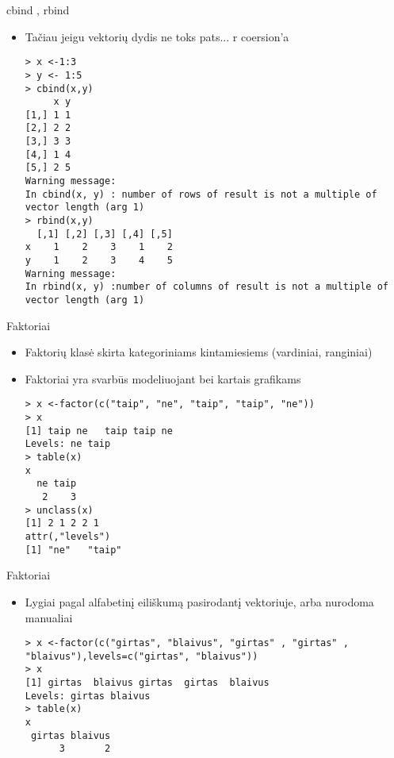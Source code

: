 \documentclass[11pt,xcolor=table]{beamer}
\begin{document}

\begin{frame}[fragile]{cbind , rbind}
\begin{itemize}
\item Tačiau jeigu vektorių dydis ne toks pats... r coersion'a 
\begin{lstlisting}
> x <-1:3
> y <- 1:5
> cbind(x,y)
     x y
[1,] 1 1
[2,] 2 2
[3,] 3 3
[4,] 1 4
[5,] 2 5
Warning message:
In cbind(x, y) : number of rows of result is not a multiple of vector length (arg 1)
> rbind(x,y)
  [,1] [,2] [,3] [,4] [,5]
x    1    2    3    1    2
y    1    2    3    4    5
Warning message:
In rbind(x, y) :number of columns of result is not a multiple of vector length (arg 1)
\end{lstlisting}
\end{itemize}
\end{frame}



\begin{frame}[fragile]{Faktoriai}
\begin{itemize}
\item Faktorių klasė skirta kategoriniams kintamiesiems (vardiniai, ranginiai)
\item Faktoriai yra svarbūs modeliuojant bei kartais grafikams

\begin{lstlisting}
> x <-factor(c("taip", "ne", "taip", "taip", "ne"))
> x
[1] taip ne   taip taip ne  
Levels: ne taip
> table(x)
x
  ne taip 
   2    3 
> unclass(x)
[1] 2 1 2 2 1
attr(,"levels")
[1] "ne"   "taip"
\end{lstlisting}
\end{itemize}
\end{frame}


\begin{frame}[fragile]{Faktoriai}
\begin{itemize}
\item Lygiai pagal alfabetinį eiliškumą pasirodantį vektoriuje, arba nurodoma manualiai

\begin{lstlisting}
> x <-factor(c("girtas", "blaivus", "girtas" , "girtas" , "blaivus"),levels=c("girtas", "blaivus"))
> x
[1] girtas  blaivus girtas  girtas  blaivus
Levels: girtas blaivus
> table(x)
x
 girtas blaivus 
      3       2  
\end{lstlisting}
\end{itemize}
\end{frame}
\end{document}
